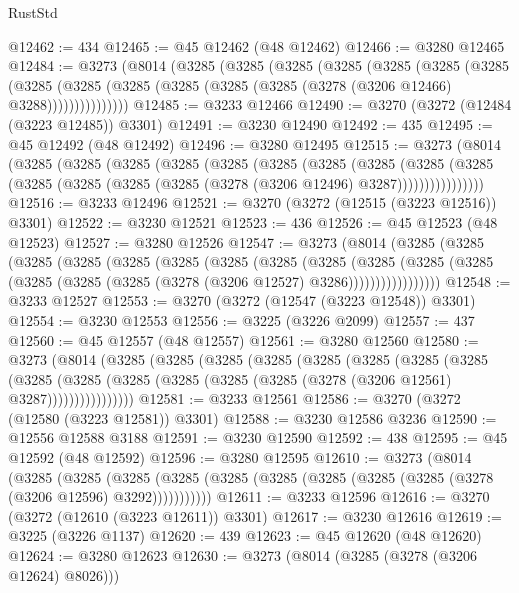 \begin{lexlean}{RustStd}
\begin{coremodule}
{\begin{coremodule}
{{{{{{{{{{{{{{{{{{{{{{{{{{{{{{{{{{{{{@12462 := 434
@12465 := @45 @12462 (@48 @12462)
@12466 := @3280 @12465
@12484 := @3273
    (@8014
      (@3285
        (@3285
          (@3285
            (@3285
              (@3285
                (@3285
                  (@3285
                    (@3285
                      (@3285 (@3285 (@3285 (@3285 (@3285 (@3278 (@3206 @12466) @3288)))))))))))))))
@12485 := @3233 @12466
@12490 := @3270 (@3272 (@12484 (@3223 @12485)) @3301)
@12491 := @3230 @12490
@12492 := 435
@12495 := @45 @12492 (@48 @12492)
@12496 := @3280 @12495
@12515 := @3273
    (@8014
      (@3285
        (@3285
          (@3285
            (@3285
              (@3285
                (@3285
                  (@3285
                    (@3285
                      (@3285
                        (@3285
                          (@3285 (@3285 (@3285 (@3285 (@3278 (@3206 @12496) @3287))))))))))))))))
@12516 := @3233 @12496
@12521 := @3270 (@3272 (@12515 (@3223 @12516)) @3301)
@12522 := @3230 @12521
@12523 := 436
@12526 := @45 @12523 (@48 @12523)
@12527 := @3280 @12526
@12547 := @3273
    (@8014
      (@3285
        (@3285
          (@3285
            (@3285
              (@3285
                (@3285
                  (@3285
                    (@3285
                      (@3285
                        (@3285
                          (@3285
                            (@3285 (@3285 (@3285 (@3285 (@3278 (@3206 @12527) @3286)))))))))))))))))
@12548 := @3233 @12527
@12553 := @3270 (@3272 (@12547 (@3223 @12548)) @3301)
@12554 := @3230 @12553
@12556 := @3225 (@3226 @2099)
@12557 := 437
@12560 := @45 @12557 (@48 @12557)
@12561 := @3280 @12560
@12580 := @3273
    (@8014
      (@3285
        (@3285
          (@3285
            (@3285
              (@3285
                (@3285
                  (@3285
                    (@3285
                      (@3285
                        (@3285
                          (@3285 (@3285 (@3285 (@3285 (@3278 (@3206 @12561) @3287))))))))))))))))
@12581 := @3233 @12561
@12586 := @3270 (@3272 (@12580 (@3223 @12581)) @3301)
@12588 := @3230 @12586 @3236
@12590 := @12556 @12588 @3188
@12591 := @3230 @12590
@12592 := 438
@12595 := @45 @12592 (@48 @12592)
@12596 := @3280 @12595
@12610 := @3273
    (@8014
      (@3285
        (@3285
          (@3285 (@3285 (@3285 (@3285 (@3285 (@3285 (@3285 (@3278 (@3206 @12596) @3292)))))))))))
@12611 := @3233 @12596
@12616 := @3270 (@3272 (@12610 (@3223 @12611)) @3301)
@12617 := @3230 @12616
@12619 := @3225 (@3226 @1137)
@12620 := 439
@12623 := @45 @12620 (@48 @12620)
@12624 := @3280 @12623
@12630 := @3273 (@8014 (@3285 (@3278 (@3206 @12624) @8026)))
}}}}}}}}}}}}}}}}}}}}}}}}}}}}}}}}}}}}}
\end{coremodule}}
\end{coremodule}
\end{lexlean}
